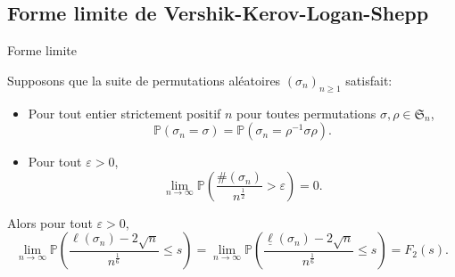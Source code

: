 \documentclass[french]{beamer}
\begin{document}
\subsection{Forme limite de Vershik-Kerov-Logan-Shepp}
 \begin{frame}{Forme limite}
    \begin{theorem}[\cite{sk}]
Supposons que la suite de permutations aléatoires  $(\sigma_n)_{n\geq 1}$ satisfait:
\begin{itemize}
\item  Pour tout entier strictement positif $n$ pour toutes permutations  $\sigma,\rho \in \mathfrak{S}_n$,
\begin{equation*}
\mathbb{P}(\sigma_n=\sigma)=\mathbb{P}(\sigma_n=\rho^{-1}\sigma\rho).
\end{equation*}
\item Pour tout $\varepsilon>0$,
\begin{equation*}
\lim_{n\to \infty}\mathbb{P}\left(\frac{\#(\sigma_n)}{n^\frac 12 }>\varepsilon\right) =0.
\end{equation*}
\end{itemize}
Alors pour  tout  $\varepsilon>0$,
\begin{equation*} 
\lim_{n\to \infty} \mathbb{P}\left(\frac{\ell(\sigma_n)-2\sqrt{n}}{n^\frac 16}\leq s\right)=\lim_{n\to \infty} \mathbb{P}\left(\frac{\underline{\ell}(\sigma_n)-2\sqrt{n}}{n^\frac 16}\leq s\right)=F_2(s).
\end{equation*}
\end{theorem}
\end{frame}
\end{document}
